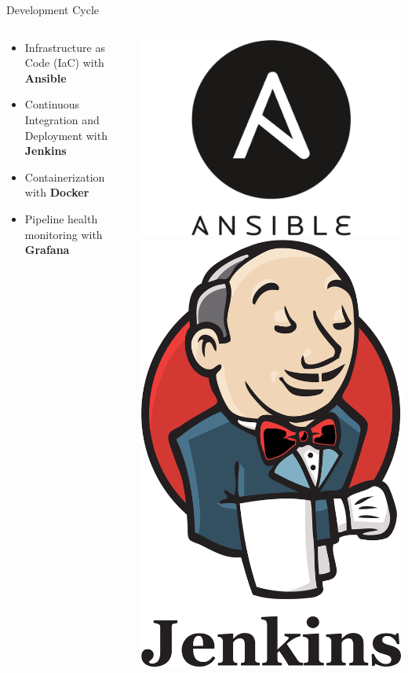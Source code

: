 \documentclass{beamer}
\begin{document}
\begin{frame}{Development Cycle}
\begin{columns}
    \begin{column}{0.5\textwidth}
    \begin{itemize}
        \item Infrastructure as Code (IaC) with \textbf{Ansible}
        \item Continuous Integration and Deployment with \textbf{Jenkins}
        \item Containerization with \textbf{Docker}
        \item Pipeline health monitoring with \textbf{Grafana}
    \end{itemize}
    \end{column}
    \begin{column}{0.25\textwidth}
        \begin{center}
        \includegraphics[width=0.8\columnwidth]{figures/ansible_icon.png} \\
        \vspace{1.25cm}
        \includegraphics[width=0.5\columnwidth]{figures/jenkins_icon.png}

\end{center}
\end{column}
\end{columns}
\end{frame}
\end{document}
